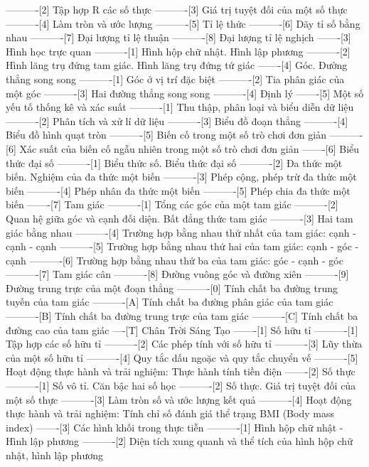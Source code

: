 ----------[2] Tập hợp R các số thực
----------[3] Giá trị tuyệt đối của một số thực
----------[4] Làm tròn và ước lượng
----------[5] Tỉ lệ thức
----------[6] Dãy tỉ số bằng nhau
----------[7] Đại lượng tỉ lệ thuận
----------[8] Đại lượng tỉ lệ nghịch
-------[3] Hình học trực quan
----------[1] Hình hộp chữ nhật. Hình lập phương
----------[2] Hình lăng trụ đứng tam giác. Hình lăng trụ đứng tứ giác
-------[4] Góc. Đường thẳng song song
----------[1] Góc ở vị trí đặc biệt
----------[2] Tia phân giác của một góc
----------[3] Hai đường thẳng song song
----------[4] Định lý
-------[5] Một số yếu tố thống kê và xác suất
----------[1] Thu thập, phân loại và biểu diễn dữ liệu
----------[2] Phân tích và xử lí dữ liệu
----------[3] Biểu đồ đoạn thẳng
----------[4] Biểu đồ hình quạt tròn
----------[5] Biến cố trong một số trò chơi đơn giản
----------[6] Xác suất của biến cố ngẫu nhiên trong một số trò chơi đơn giản
-------[6] Biểu thức đại số
----------[1] Biểu thức số. Biểu thức đại số
----------[2] Đa thức một biến. Nghiệm của đa thức một biến
----------[3] Phép cộng, phép trừ đa thức một biến
----------[4] Phép nhân đa thức một biến
----------[5] Phép chia đa thức một biến
-------[7] Tam giác
----------[1] Tổng các góc của một tam giác
----------[2] Quan hệ giữa góc và cạnh đối diện. Bất đẳng thức tam giác
----------[3] Hai tam giác bằng nhau
----------[4] Trường hợp bằng nhau thứ nhất của tam giác: cạnh - cạnh - cạnh
----------[5] Trường hợp bằng nhau thứ hai của tam giác: cạnh - góc - cạnh
----------[6] Trường hợp bằng nhau thứ ba của tam giác: góc - cạnh - góc
----------[7] Tam giác cân
----------[8] Đường vuông góc và đường xiên
----------[9] Đường trung trực của một đoạn thẳng
----------[0] Tính chất ba đường trung tuyến của tam giác
----------[A] Tính chất ba đường phân giác của tam giác
----------[B] Tính chất ba đường trung trực của tam giác
----------[C] Tính chất ba đường cao của tam giác
----[T] Chân Trời Sáng Tạo
-------[1] Số hữu tỉ
----------[1] Tập hợp các số hữu tỉ
----------[2] Các phép tính với số hữu tỉ
----------[3] Lũy thừa của một số hữu tỉ
----------[4] Quy tắc dấu ngoặc và quy tắc chuyển vế
----------[5] Hoạt động thực hành và trải nghiệm: Thực hành tính tiền điện
-------[2] Số thực
----------[1] Số vô tỉ. Căn bậc hai số học
----------[2] Số thực. Giá trị tuyệt đối của một số thực
----------[3] Làm tròn số và ước lượng kết quả
----------[4] Hoạt động thực hành và trải nghiệm: Tính chỉ số đánh giá thể trạng BMI (Body mass index)
-------[3] Các hình khối trong thực tiễn
----------[1] Hình hộp chữ nhật - Hình lập phương
----------[2] Diện tích xung quanh và thể tích của hình hộp chữ nhật, hình lập phương
